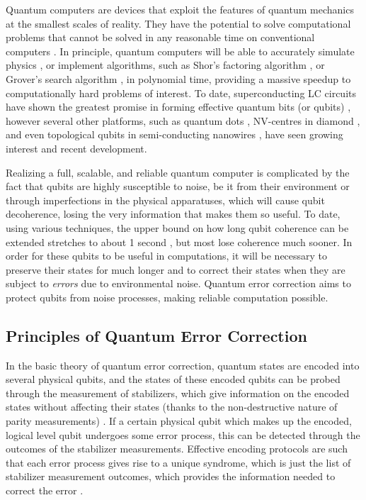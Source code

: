 
Quantum computers are devices that exploit the features of quantum mechanics at
the smallest scales of reality. They have the potential to solve computational
problems that cannot be solved in any reasonable time on conventional computers
\cite{fowler12_surfac_codes}. In principle, quantum computers will be able to
accurately simulate physics \cite{feynman82_simul_physic_with_comput}, or implement
algorithms, such as Shor's factoring algorithm \cite{Shor_1997}, or Grover's
search algorithm \cite{Grover_1996}, in polynomial time, providing a massive
speedup to computationally hard problems of interest. To date, superconducting
LC circuits have shown the greatest promise in forming effective quantum bits
(or qubits) \cite{Rol_2019} \cite{barends14_super_quant_circuit_at_surfac},
however several other platforms, such as quantum dots
\cite{huang19_fidel_bench_two_qubit_gates_silic} \cite{Lawrie_2020}, NV-centres
in diamond \cite{Taminiau_2014}, and even topological qubits in semi-conducting
nanowires \cite{Mourik_2012}, have seen growing interest and recent development.

Realizing a full, scalable, and reliable quantum computer is complicated by the
fact that qubits are highly susceptible to noise, be it from their environment
or through imperfections in the physical apparatuses, which will
cause qubit decoherence, losing the very information that makes them so useful.
To date, using various techniques, the upper bound on how long qubit coherence
can be extended stretches to about 1 second \cite{Abobeih_2018}, but most lose
coherence much sooner. In order for these qubits to be useful in computations,
it will be necessary to preserve their states for much longer and to correct
their states when they are subject to \textit{errors} due to environmental
noise. Quantum error correction aims to protect qubits from noise processes,
making reliable computation possible.

\subsection{Principles of Quantum Error Correction}
In the basic theory of quantum error correction, quantum states are encoded into
several physical qubits, and the states of these encoded qubits can be probed
through the measurement of stabilizers, which give information on the encoded
states without affecting their states (thanks to the non-destructive nature of
parity measurements) \cite{nielsen_chuang_2010}. If a certain physical qubit
which makes up the encoded, logical level qubit undergoes some error process,
this can be detected through the outcomes of the stabilizer measurements.
Effective encoding protocols are such that each error process gives rise to a
unique syndrome, which is just the list of stabilizer measurement outcomes,
which provides the information needed to correct the error \cite{fowler12_surfac_codes}.

